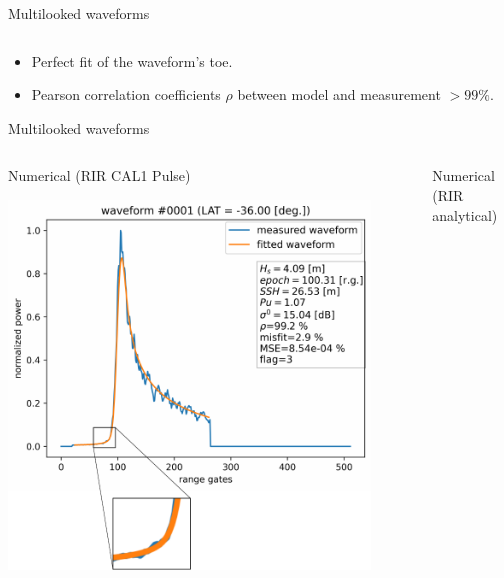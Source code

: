 \documentclass[compress,8pt]{beamer}
\begin{document}
\begin{frame}{Multilooked waveforms}
\begin{columns}
\begin{column}{0.45\textwidth}
\end{column}
\end{columns}

\begin{itemize}
 \item Perfect fit of the waveform's toe.
 \item Pearson correlation coefficients $\rho$ between model and measurement $> 99\%$.
\end{itemize}

\end{frame}



\begin{frame}{Multilooked waveforms}
 
 
 \begin{columns}
\begin{column}{0.45\textwidth}\centering

Numerical (RIR CAL1 Pulse)

  \includegraphics[width=0.9\textwidth]{fig/wfm_1_num_PTRnum_zoom}

\end{column}
\begin{column}{0.45\textwidth}\centering

Numerical (RIR analytical)


\end{column}
\end{columns}
\end{frame}
\end{document}
